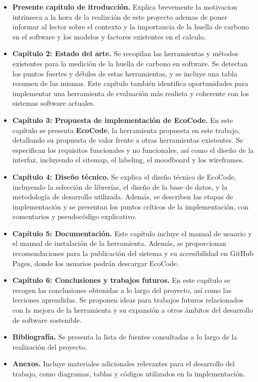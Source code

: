 \documentclass[12pt,a4paper]{report}
\begin{document}
\begin{itemize}
  \item \textbf{Presente capitulo de itroducción.} Explica brevemente la motivacion intrinseca a la hora de la realizción de este proyecto ademas de poner informar al lector sobre el contexto y la importancia de la huella
        de carbono en el software y los modelos y factores existentes en el calculo.
  \item \textbf{Capítulo 2: Estado del arte.} Se recopilan las herramientas y métodos existentes para la medición de la huella de carbono en software. Se detectan los puntos fuertes y débiles de estas herramientas, y se incluye una tabla resumen de las mismas. Este capítulo también identifica oportunidades para implementar una herramienta de evaluación más realista y coherente con los sistemas software actuales.
  \item \textbf{Capítulo 3: Propuesta de implementación de EcoCode.} En este capítulo se presenta \textbf{EcoCode}, la herramienta propuesta en este trabajo, detallando su propuesta de valor frente a otras herramientas existentes. Se especifican los requisitos funcionales y no funcionales, así como el diseño de la interfaz, incluyendo el sitemap, el labeling, el moodboard y los wireframes.
  \item \textbf{Capítulo 4: Diseño técnico.} Se explica el diseño técnico de EcoCode, incluyendo la selección de librerías, el diseño de la base de datos, y la metodología de desarrollo utilizada. Además, se describen las etapas de implementación y se presentan los puntos críticos de la implementación, con comentarios y pseudocódigo explicativo.
  \item \textbf{Capítulo 5: Documentación.} Este capítulo incluye el manual de usuario y el manual de instalación de la herramienta. Además, se proporcionan recomendaciones para la publicación del sistema y su accesibilidad en GitHub Pages, donde los usuarios podrán descargar EcoCode.
  \item \textbf{Capítulo 6: Conclusiones y trabajos futuros.} En este capítulo se recogen las conclusiones obtenidas a lo largo del proyecto, así como las lecciones aprendidas. Se proponen ideas para trabajos futuros relacionados con la mejora de la herramienta y su expansión a otros ámbitos del desarrollo de software sostenible.
  \item \textbf{Bibliografía.} Se presenta la lista de fuentes consultadas a lo largo de la realización del proyecto.
  \item \textbf{Anexos.} Incluye materiales adicionales relevantes para el desarrollo del trabajo, como diagramas, tablas y códigos utilizados en la implementación.
\end{itemize}
\end{document}
